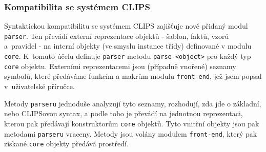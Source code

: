 \subsubsection{Kompatibilita se systémem CLIPS}
Syntaktickou kompatibilitu se systémem CLIPS zajišťuje nově přidaný modul
\verb|parser|. Ten převádí externí reprezentace objektů - šablon, faktů, vzorů
a~pravidel - na interní objekty (ve smyslu instance třídy) definované v modulu
\verb|core|. K~tomuto účelu definuje \verb|parser| metodu \verb|parse-<object>|
pro každý typ \verb|core| objektu. Externími reprezentacemi jsou (případně
vnořené) seznamy symbolů, které předáváme funkcím a makrům modulu
\verb|front-end|, jež jsem popsal v~uživatelské příručce.

Metody \verb|parseru| jednoduše analyzují tyto seznamy, rozhodují, zda jde o
základní, nebo CLIPSovou syntax, a podle toho je převádí na jednotnou
reprezentaci, kterou pak předávají konstruktorům \verb|core| objektů. Tyto
vnitřní objekty jsou pak metodami \verb|parseru| vraceny. Metody jsou volány
modulem \verb|front-end|, který pak získané \verb|core| objekty předává
prostředí.
